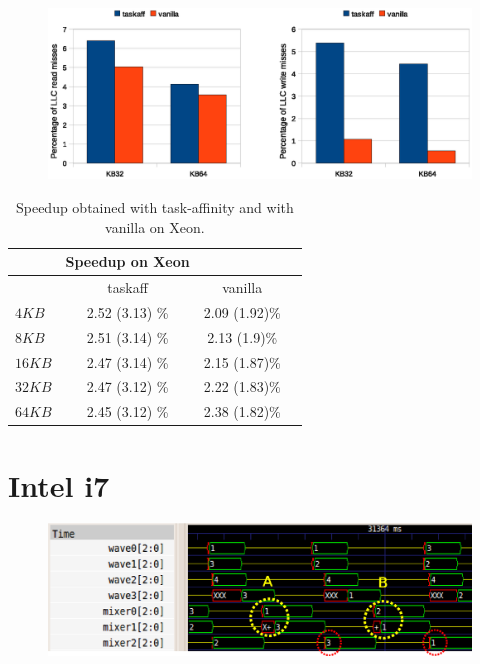 \begin{figure}[htbp]
\centering
\includegraphics[width=\widefigure]{images/results_xeon/l2_load_store_xeon.eps}
\caption{}
\label{fig:l2_load_store_xeon}
\end{figure}

\begin{table}[htbp]
\begin{center}
\begin{tabular}{l|c|c|c}
	\hline
	& Speedup on Xeon \\ \hline
	& taskaff & vanilla \\ \hline
	$4KB$  & 2.52 (3.13) \% & 2.09 (1.92)\% \\ \hline
	$8KB$  & 2.51 (3.14) \% & 2.13 (1.9)\% \\ \hline
	$16KB$ & 2.47 (3.14) \% & 2.15 (1.87)\% \\ \hline
	$32KB$ & 2.47 (3.12) \% & 2.22 (1.83)\% \\ \hline
	$64KB$ & 2.45 (3.12) \% & 2.38 (1.82)\% \\ \hline
\end{tabular}
\label{tab:speedup_xeon_i7}
\caption{Speedup obtained with task-affinity and with vanilla on Xeon.}
\end{center}
\end{table}

\section{Intel i7}

\begin{figure}[htbp]
\centering
\includegraphics[width=\widefigure]{images/results_i7/final_i7.eps}
\caption{}
\label{fig:trace_i7}
\end{figure}

